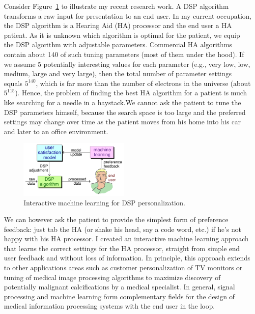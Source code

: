 \documentclass[11pt]{article}
\begin{document}
Consider Figure~\ref{fig:ML-SP-loop} to illustrate my recent research work. A DSP algorithm transforms a raw input for presentation to an end user. In my current occupation, the DSP algorithm is a Hearing Aid (HA) processor and the end user a HA patient. As it is unknown which algorithm is optimal for the patient, we equip the DSP algorithm with adjustable parameters. Commercial HA algorithms contain about 140 of such tuning parameters (most of them under the hood). If we assume $5$ potentially interesting values for each parameter (e.g., very low, low, medium, large and very large), then the total number of parameter settings equals $5^{140}$, which is far more than the number of electrons in the universe (about $5^{115}$). Hence, the problem of finding the best HA algorithm for a patient is much like searching for a needle in a haystack.We cannot ask the patient to tune the DSP parameters himself, because the search space is too large and the preferred settings may change over time as the patient moves from his home into his car and later to an office environment.  
\begin{figure}
  \vspace{-20pt}
  \begin{center}
    \includegraphics[width=0.48\textwidth]{ML-SP-loop}
  \end{center}
  \vspace{-20pt}
  \caption{Interactive machine learning for DSP personalization.}
  \vspace{-10pt}
  \label{fig:ML-SP-loop}
\end{figure}We can however ask the patient to provide the simplest form of preference feedback: just tab the HA (or shake his head, say a code word, etc.) if he's not happy with his HA processor. I created an interactive machine learning approach that learns the correct settings for the HA processor, straight from simple end user feedback and without loss of information. In principle, this approach extends to other applications areas such as customer personalization of TV monitors or tuning of medical image processing algorithms to maximize discovery of potentially malignant calcifications by a medical specialist. In general, signal processing and machine learning form complementary fields for the design of medical information processing systems with the end user in the loop.
\end{document}

